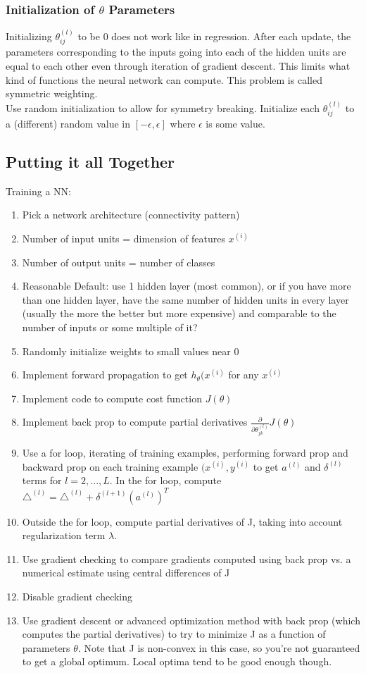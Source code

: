 \documentclass[11pt,letterpaper]{article}
\begin{document}
\subsubsection{Initialization of $\theta$ Parameters}
Initializing $\theta_{ij}^{(l)}$ to be 0 does not work like in regression. After each update, the parameters corresponding to the inputs going into each of the hidden units are equal to each other even through iteration of gradient descent. This limits what kind of functions the neural network can compute. This problem is called symmetric weighting.\\
Use random initialization to allow for symmetry breaking. Initialize each $\theta_{ij}^{(l)}$ to a (different) random value in $[-\epsilon, \epsilon]$ where $\epsilon$ is some value.

\subsection{Putting it all Together}
Training a NN:
\begin{enumerate}
	\item Pick a network architecture (connectivity pattern)
	\item Number of input units = dimension of features $x^{(i)}$
	\item Number of output units = number of classes
	\item Reasonable Default: use 1 hidden layer (most common), or if you have more than one hidden layer, have the same number of hidden units in every layer (usually the more the better but more expensive) and comparable to the number of inputs or some multiple of it?
	\item Randomly initialize weights to small values near 0
	\item Implement forward propagation to get $h_\theta(x^{(i)}$ for any $x^{(i)}$
	\item Implement code to compute cost function $J(\theta)$
	\item Implement back prop to compute partial derivatives $\frac{\partial}{\partial \theta_{jk}^{(l)}}J(\theta)$
	\item Use a for loop, iterating of training examples, performing forward prop and backward prop on each training example $(x^{(i)}, y^{(i)}$ to get $a^{(l)}$ and $\delta^{(l)}$ terms for $l=2,...,L$. In the for loop, compute $\triangle^{(l)} = \triangle^{(l)} + \delta^{(l+1)}(a^{(l)})^T$
	\item Outside the for loop, compute partial derivatives of J, taking into account regularization term $\lambda$.
	\item Use gradient checking to compare gradients computed using back prop vs. a numerical estimate using central differences of J
	\item Disable gradient checking
	\item Use gradient descent or advanced optimization method with back prop (which computes the partial derivatives) to try to minimize J as a function of parameters $\theta$. Note that J is non-convex in this case, so you're not guaranteed to get a global optimum. Local optima tend to be good enough though.
\end{enumerate}
\end{document}

